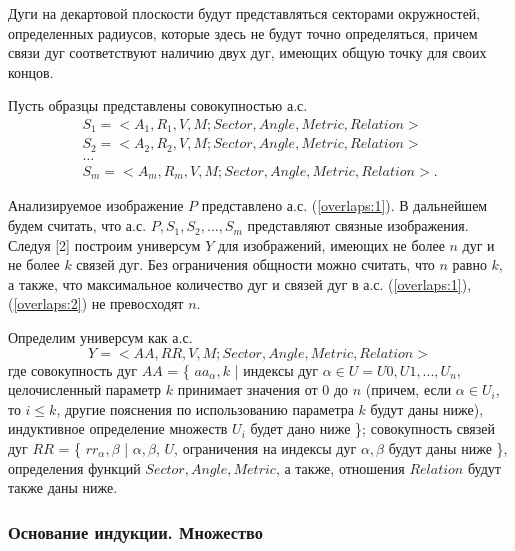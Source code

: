 \begin{remark}
Дуги на декартовой плоскости будут представляться секторами окружностей, определенных радиусов, которые здесь не будут точно определяться, причем связи дуг соответствуют наличию двух дуг, имеющих общую точку для своих концов.  
\end{remark}
Пусть образцы представлены совокупностью   а.с. 
\begin{equation}
\begin{array}{c}
S_1 = < A_1, R_1, V, M; Sector,Angle,Metric,Relation > \\
S_2 = < A_2, R_2, V, M; Sector,Angle,Metric,Relation >  \\                                        
\dots \\
S_m = < A_m, R_m, V, M; Sector,Angle,Metric,Relation >.
\end{array}
\label{overlaps:2}
\end{equation}

Анализируемое изображение $P$ представлено  а.с.  (\ref{overlaps:1}). В дальнейшем будем считать, что а.с. $P, S_1, S_2, . . ., S_m$  представляют связные изображения. 
Следуя [2] построим универсум $Y$ для изображений, имеющих не более $n$ дуг и не более $k$ связей дуг. Без ограничения общности можно считать, что $n$ равно $k$, а также, что максимальное количество дуг и связей дуг в  а.с. (\ref{overlaps:1}), (\ref{overlaps:2})  не превосходят  $n$.    

Определим универсум как  а.с.  
\begin{equation}
Y = < AA, RR, V, M; Sector,  Angle, Metric, Relation >
\label{overlaps:3}
\end{equation}
\noindent
где  совокупность дуг $AA$ = \{ $aa_\alpha,k$ | индексы дуг $\alpha \in U = U0, U1, ..., U_n$,  целочисленный параметр  $k$  принимает значения от  0  до $n$ (причем,  если  $\alpha \in  U_i$,  то $i \leq k$, другие  пояснения по использованию параметра  $k$  будут даны ниже),  индуктивное определение множеств  $U_i$  будет дано ниже \};
совокупность связей дуг $RR$ = \{ $rr_\alpha, \beta$ | $\alpha, \beta$, $U$, ограничения на индексы дуг $\alpha, \beta$  будут даны ниже \}, 
определения функций  $Sector,  Angle, Metric$, а также, отношения $Relation$  будут также даны ниже.      \\

\subsubsection{Основание индукции.  Множество  }

